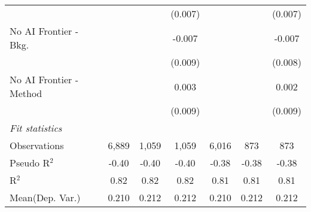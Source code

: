 \begin{tabular}{lcccccc}
                           &                &         & (0.007) &                &         & (0.007)\\   
   No AI Frontier - Bkg.   &                &         & -0.007  &                &         & -0.007\\   
                           &                &         & (0.009) &                &         & (0.008)\\   
   No AI Frontier - Method &                &         & 0.003   &                &         & 0.002\\   
                           &                &         & (0.009) &                &         & (0.009)\\   
   \midrule
   \emph{Fit statistics}\\
   Observations            & 6,889          & 1,059   & 1,059   & 6,016          & 873     & 873\\  
   Pseudo R$^2$            & -0.40          & -0.40   & -0.40   & -0.38          & -0.38   & -0.38\\  
   R$^2$                   & 0.82           & 0.82    & 0.82    & 0.81           & 0.81    & 0.81\\  
Mean(Dep. Var.) & 0.210 & 0.212 & 0.212 & 0.210 & 0.212 & 0.212 \\
   

\end{tabular}
